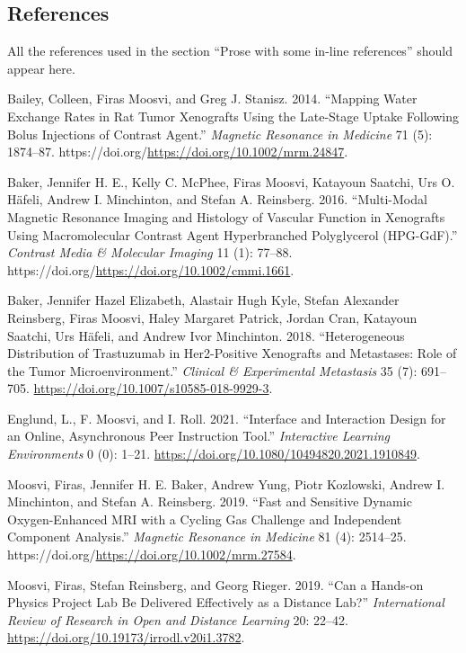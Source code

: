 \documentclass[
]{article}
\newlength{\cslhangindent}
\newenvironment{CSLReferences}[2] %
 {%
  \setlength{\parindent}{0pt}
  \ifodd #1 \everypar{\setlength{\hangindent}{\cslhangindent}}\ignorespaces\fi
  \ifnum #2 > 0
  \setlength{\parskip}{#2\baselineskip}
  \fi
 }%
 {}
\begin{document}
\hypertarget{references}{%
\subsection{References}\label{references}}

All the references used in the section ``Prose with some in-line
references'' should appear here.

\hypertarget{refs}{}
\begin{CSLReferences}{1}{0}
\leavevmode{}%
Bailey, Colleen, Firas Moosvi, and Greg J. Stanisz. 2014. {``Mapping
Water Exchange Rates in Rat Tumor Xenografts Using the Late-Stage Uptake
Following Bolus Injections of Contrast Agent.''} \emph{Magnetic
Resonance in Medicine} 71 (5): 1874--87.
https://doi.org/\url{https://doi.org/10.1002/mrm.24847}.

\leavevmode{}%
Baker, Jennifer H. E., Kelly C. McPhee, Firas Moosvi, Katayoun Saatchi,
Urs O. Häfeli, Andrew I. Minchinton, and Stefan A. Reinsberg. 2016.
{``Multi-Modal Magnetic Resonance Imaging and Histology of Vascular
Function in Xenografts Using Macromolecular Contrast Agent Hyperbranched
Polyglycerol (HPG-GdF).''} \emph{Contrast Media \& Molecular Imaging} 11
(1): 77--88. https://doi.org/\url{https://doi.org/10.1002/cmmi.1661}.

\leavevmode{}%
Baker, Jennifer Hazel Elizabeth, Alastair Hugh Kyle, Stefan Alexander
Reinsberg, Firas Moosvi, Haley Margaret Patrick, Jordan Cran, Katayoun
Saatchi, Urs Häfeli, and Andrew Ivor Minchinton. 2018. {``Heterogeneous
Distribution of Trastuzumab in Her2-Positive Xenografts and Metastases:
Role of the Tumor Microenvironment.''} \emph{Clinical \& Experimental
Metastasis} 35 (7): 691--705.
\url{https://doi.org/10.1007/s10585-018-9929-3}.

\leavevmode{}%
Englund, L., F. Moosvi, and I. Roll. 2021. {``Interface and Interaction
Design for an Online, Asynchronous Peer Instruction Tool.''}
\emph{Interactive Learning Environments} 0 (0): 1--21.
\url{https://doi.org/10.1080/10494820.2021.1910849}.

\leavevmode{}%
Moosvi, Firas, Jennifer H. E. Baker, Andrew Yung, Piotr Kozlowski,
Andrew I. Minchinton, and Stefan A. Reinsberg. 2019. {``Fast and
Sensitive Dynamic Oxygen-Enhanced MRI with a Cycling Gas Challenge and
Independent Component Analysis.''} \emph{Magnetic Resonance in Medicine}
81 (4): 2514--25.
https://doi.org/\url{https://doi.org/10.1002/mrm.27584}.

\leavevmode{}%
Moosvi, Firas, Stefan Reinsberg, and Georg Rieger. 2019. {``Can a
Hands-on Physics Project Lab Be Delivered Effectively as a Distance
Lab?''} \emph{International Review of Research in Open and Distance
Learning} 20: 22--42. \url{https://doi.org/10.19173/irrodl.v20i1.3782}.

\end{CSLReferences}
\end{document}
